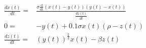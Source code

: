 \begin{align}
\frac{dx(t)}{dt} =& \frac{\sigma \mathrm{\frac{d}{d t}}\left( x\left( t \right) - y\left( t \right) \right) \left( y\left( t \right) - x\left( t \right) \right)}{\frac{dz(t)}{dt}} \\
0 =&  - y\left( t \right) + 0.1 \sigma x\left( t \right) \left( \rho - z\left( t \right) \right) \\
\frac{dz(t)}{dt} =& \left( y\left( t \right) \right)^{\frac{2}{3}} x\left( t \right) - \beta z\left( t \right)
\end{align}

